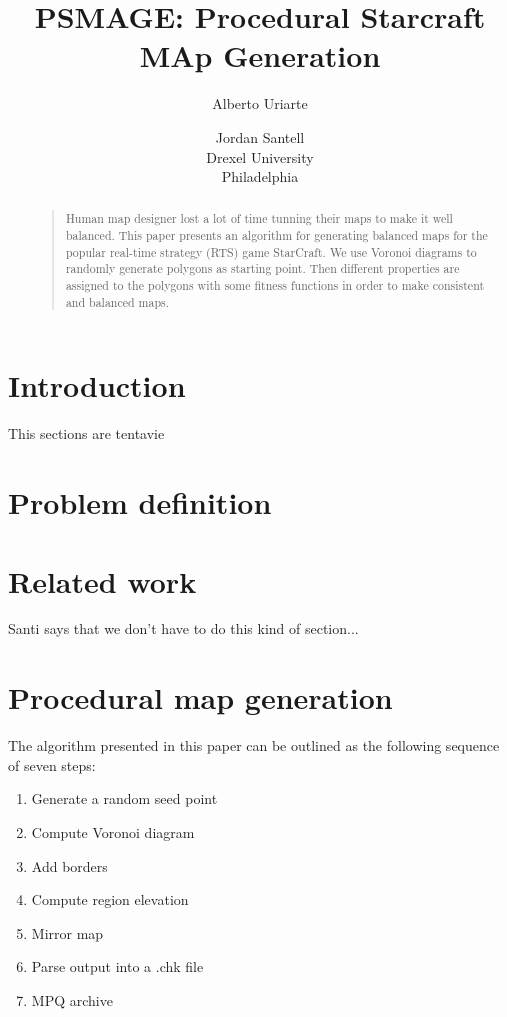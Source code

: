 \documentclass[letterpaper]{article}
\begin{document}
%
\title{PSMAGE: Procedural Starcraft MAp Generation}
\author{Alberto Uriarte \and Jordan Santell\\
Drexel University\\
Philadelphia\\
}
\maketitle
\begin{abstract}
\begin{quote}
Human map designer lost a lot of time tunning their maps to make it well balanced. This paper presents an algorithm for generating balanced maps for the popular real-time strategy (RTS) game StarCraft. We use Voronoi diagrams to randomly generate polygons as starting point. Then different properties are assigned to the polygons with some fitness functions in order to make consistent and balanced maps.
\end{quote}
\end{abstract}

\section{Introduction}
This sections are tentavie

\section{Problem definition}

\section{Related work}
Santi says that we don't have to do this kind of section...

\section{Procedural map generation}
The algorithm presented in this paper can be outlined as the following sequence of seven steps:
\begin{enumerate}
	\item Generate a random seed point
	\item Compute Voronoi diagram
	\item Add borders
	\item Compute region elevation
	\item Mirror map
	\item Parse output into a .chk file
	\item MPQ archive
\end{enumerate}
\end{document}
